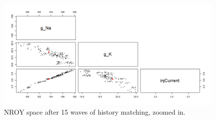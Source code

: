 \documentclass{article}
\begin{document}
\begin{figure}
    \centering
    \includegraphics[width=\linewidth]{Example1/char15_zoomed_orig.png}
    \caption{NROY space after 15 waves of history matching, zoomed in.}
    \label{fig:ex1-char15_zoomed}
\end{figure}
\newpage


\end{document}
